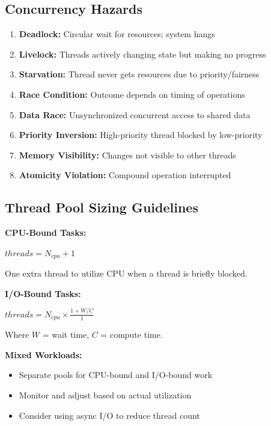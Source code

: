 \documentclass[11pt,letterpaper]{article}
\begin{document}
\subsection{Concurrency Hazards}

\begin{hazardbox}
\begin{enumerate}[nosep]
    \item \textbf{Deadlock:} Circular wait for resources; system hangs
    \item \textbf{Livelock:} Threads actively changing state but making no progress
    \item \textbf{Starvation:} Thread never gets resources due to priority/fairness
    \item \textbf{Race Condition:} Outcome depends on timing of operations
    \item \textbf{Data Race:} Unsynchronized concurrent access to shared data
    \item \textbf{Priority Inversion:} High-priority thread blocked by low-priority
    \item \textbf{Memory Visibility:} Changes not visible to other threads
    \item \textbf{Atomicity Violation:} Compound operation interrupted
\end{enumerate}
\end{hazardbox}

\subsection{Thread Pool Sizing Guidelines}

\begin{concurrencybox}
\textbf{CPU-Bound Tasks:}
\begin{center}
$threads = N_{cpu} + 1$
\end{center}
One extra thread to utilize CPU when a thread is briefly blocked.

\textbf{I/O-Bound Tasks:}
\begin{center}
$threads = N_{cpu} \times \frac{1 + W/C}{1}$
\end{center}
Where $W$ = wait time, $C$ = compute time.

\textbf{Mixed Workloads:}
\begin{itemize}[nosep]
    \item Separate pools for CPU-bound and I/O-bound work
    \item Monitor and adjust based on actual utilization
    \item Consider using async I/O to reduce thread count
\end{itemize}
\end{concurrencybox}
\end{document}
